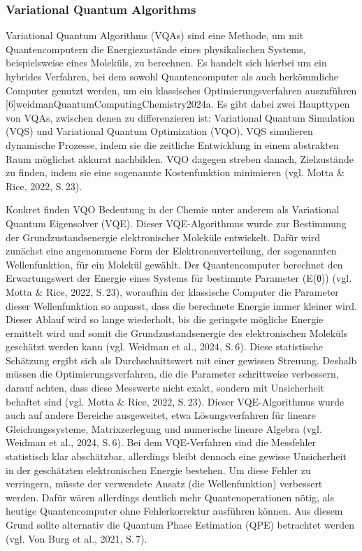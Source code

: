 \subsubsection*{Variational Quantum Algorithms}
Variational Quantum Algorithms (VQAs) sind eine Methode, um mit Quantencomputern die Energiezustände eines physikalischen Systems, beispielsweise eines Moleküls, zu berechnen. Es handelt sich hierbei um ein hybrides Verfahren, bei dem sowohl Quantencomputer als auch herkömmliche Computer genutzt werden, um ein klassisches Optimierungsverfahren auszuführen [6]{weidmanQuantumComputingChemistry2024a}.
Es gibt dabei zwei Haupttypen von VQAs, zwischen denen zu differenzieren ist: Variational Quantum Simulation (VQS) und Variational Quantum Optimization (VQO). VQS simulieren dynamische Prozesse, indem sie die zeitliche Entwicklung in einem abstrakten Raum möglichst akkurat nachbilden. VQO dagegen streben danach, Zielzustände zu finden, indem sie eine sogenannte Kostenfunktion minimieren (vgl. Motta & Rice, 2022, S. 23).

Konkret finden VQO Bedeutung in der Chemie unter anderem als Variational Quantum Eigensolver (VQE). Dieser VQE-Algorithmus wurde zur Bestimmung der Grundzustandsenergie elektronischer Moleküle entwickelt. Dafür wird zunächst eine angenommene Form der Elektronenverteilung, der sogenannten Wellenfunktion, für ein Molekül gewählt. Der Quantencomputer berechnet den Erwartungswert der Energie eines Systems für bestimmte Parameter (E(θ)) (vgl. Motta & Rice, 2022, S. 23), woraufhin der klassische Computer die Parameter dieser Wellenfunktion so anpasst, dass die berechnete Energie immer kleiner wird. Dieser Ablauf wird so lange wiederholt, bis die geringste mögliche Energie ermittelt wird und somit die Grundzustandsenergie des elektronischen Moleküls geschätzt werden kann (vgl. Weidman et al., 2024, S. 6).
Diese statistische Schätzung ergibt sich als Durchschnittswert mit einer gewissen Streuung. Deshalb müssen die Optimierungsverfahren, die die Parameter schrittweise verbessern, darauf achten, dass diese Messwerte nicht exakt, sondern mit Unsicherheit behaftet sind (vgl. Motta & Rice, 2022, S. 23).
Dieser VQE-Algorithmus wurde auch auf andere Bereiche ausgeweitet, etwa Lösungsverfahren für lineare Gleichungssysteme, Matrixzerlegung und numerische lineare Algebra (vgl. Weidman et al., 2024, S. 6).
Bei dem VQE-Verfahren sind die Messfehler statistisch klar abschätzbar, allerdings bleibt dennoch eine gewisse Unsicherheit in der geschätzten elektronischen Energie bestehen. Um diese Fehler zu verringern, müsste der verwendete Ansatz (die Wellenfunktion) verbessert werden. Dafür wären allerdings deutlich mehr Quantenoperationen nötig, als heutige Quantencomputer ohne Fehlerkorrektur ausführen können. Aus diesem Grund sollte alternativ die Quantum Phase Estimation (QPE) betrachtet werden (vgl. Von Burg et al., 2021, S. 7).



